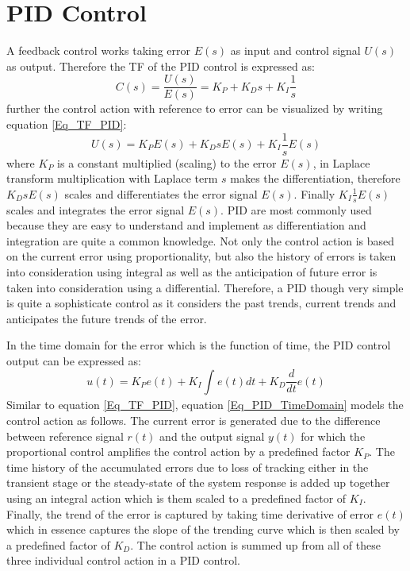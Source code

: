 \section{PID Control}

A feedback control works taking error $E(s)$ as input and control signal $U(s)$ as output. Therefore the TF of the PID control is expressed as:
\begin{equation} \label{Eq_TF_PID}
	C(s) = \frac{U(s)}{E(s)} = K_P + K_D s + K_I \frac{1}{s}
\end{equation}
further the control action with reference to error can be visualized by writing equation \eqref{Eq_TF_PID}:
\begin{equation} \label{Eq_PID_ControlAction}
	U(s) = K_P E(s) + K_D s E(s) + K_I \frac{1}{s} E(s)
\end{equation}
where $K_P$ is a constant multiplied (scaling) to the error $E(s)$, in Laplace transform multiplication with Laplace term $s$ makes the differentiation, therefore $K_D s E(s)$ scales and differentiates the error signal $E(s)$. Finally $ K_I \frac{1}{s} E(s)$ scales and integrates the error signal $E(s)$. PID are most commonly used because they are easy to understand and implement as differentiation and integration are quite a common knowledge. Not only the control action is based on the current error using proportionality, but also the history of errors is taken into consideration using integral as well as the anticipation of future error is taken into consideration using a differential. Therefore, a PID though very simple is quite a sophisticate control as it considers the past trends, current trends and anticipates the future trends of the error.

In the time domain for the error which is the function of time, the PID control output can be expressed as:
\begin{equation} \label{Eq_PID_TimeDomain}
	u(t) = K_P e(t) + K_I \int_{}^{} e(t) dt + K_D \frac{d}{dt} e(t)
\end{equation}
Similar to equation \eqref{Eq_TF_PID}, equation \eqref{Eq_PID_TimeDomain} models the control action as follows. The current error is generated due to the difference between reference signal $r(t)$ and the output signal $y(t)$ for which the proportional control amplifies the control action by a predefined factor $K_P$. The time history of the accumulated errors due to loss of tracking either in the transient stage or the steady-state of the system response is added up together using an integral action which is them scaled to a predefined factor of $K_I$. Finally, the trend of the error is captured by taking time derivative of error $e(t)$ which in essence captures the slope of the trending curve which is then scaled by a predefined factor of $K_D$. The control action is summed up from all of these three individual control action in a PID control.

